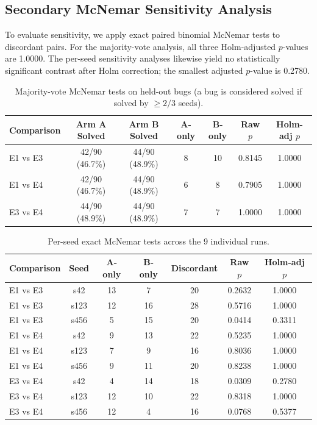 \documentclass{article}
\begin{document}
\subsection{Secondary McNemar Sensitivity Analysis}
To evaluate sensitivity, we apply exact paired binomial McNemar tests to discordant pairs. For the majority-vote analysis, all three Holm-adjusted $p$-values are 1.0000. The per-seed sensitivity analyses likewise yield no statistically significant contrast after Holm correction; the smallest adjusted $p$-value is 0.2780.

\begin{table}[h]
\centering
\small
\begin{tabular}{l c c c c c c}
\toprule
\textbf{Comparison} & \textbf{Arm A Solved} & \textbf{Arm B Solved} & \textbf{A-only} & \textbf{B-only} & \textbf{Raw $p$} & \textbf{Holm-adj $p$} \\
\midrule
E1 vs E3 & 42/90 (46.7\%) & 44/90 (48.9\%) & 8 & 10 & 0.8145 & 1.0000 \\
E1 vs E4 & 42/90 (46.7\%) & 44/90 (48.9\%) & 6 & 8 & 0.7905 & 1.0000 \\
E3 vs E4 & 44/90 (48.9\%) & 44/90 (48.9\%) & 7 & 7 & 1.0000 & 1.0000 \\
\bottomrule
\end{tabular}
\caption{Majority-vote McNemar tests on held-out bugs (a bug is considered solved if solved by $\ge 2/3$ seeds).}
\label{tab:mcnemar_majority}
\end{table}

\begin{table}[h]
\centering
\small
\begin{tabular}{l c c c c c c}
\toprule
\textbf{Comparison} & \textbf{Seed} & \textbf{A-only} & \textbf{B-only} & \textbf{Discordant} & \textbf{Raw $p$} & \textbf{Holm-adj $p$} \\
\midrule
E1 vs E3 & s42  & 13 & 7  & 20 & 0.2632 & 1.0000 \\
E1 vs E3 & s123 & 12 & 16 & 28 & 0.5716 & 1.0000 \\
E1 vs E3 & s456 & 5  & 15 & 20 & 0.0414 & 0.3311 \\
E1 vs E4 & s42  & 9  & 13 & 22 & 0.5235 & 1.0000 \\
E1 vs E4 & s123 & 7  & 9  & 16 & 0.8036 & 1.0000 \\
E1 vs E4 & s456 & 9  & 11 & 20 & 0.8238 & 1.0000 \\
E3 vs E4 & s42  & 4  & 14 & 18 & 0.0309 & 0.2780 \\
E3 vs E4 & s123 & 12 & 10 & 22 & 0.8318 & 1.0000 \\
E3 vs E4 & s456 & 12 & 4  & 16 & 0.0768 & 0.5377 \\
\bottomrule
\end{tabular}
\caption{Per-seed exact McNemar tests across the 9 individual runs.}
\label{tab:mcnemar_perseed}
\end{table}
\end{document}
